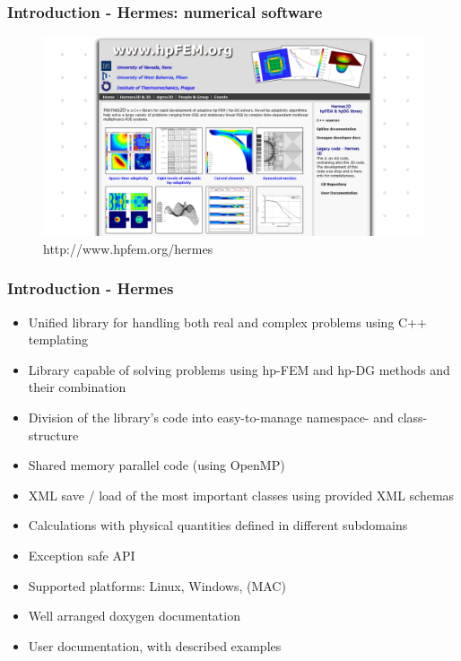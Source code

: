 \documentclass{beamer}
\begin{document}
\begin{frame}
\frametitle{Introduction - Hermes: numerical software}
\begin{figure}[!ht]
\vspace{-1mm}
\begin{center}
\includegraphics[width=1.0\textwidth]{hermes-site.png}
\caption{http://www.hpfem.org/hermes}
\end{center}
\noindent
\vspace{-4mm}
\end{figure}
\end{frame}

\begin{frame}
\frametitle{Introduction - Hermes}
\begin{itemize}
      \item    Unified library for handling both real and complex problems using C++ templating
      \item    Library capable of solving problems using hp-FEM and hp-DG methods and their combination
      \item    Division of the library's code into easy-to-manage namespace- and class- structure
      \item    Shared memory parallel code (using OpenMP)
      \item    XML save / load of the most important classes using provided XML schemas
      \item    Calculations with physical quantities defined in different subdomains
      \item    Exception safe API 
      \item    Supported platforms: Linux, Windows, (MAC)
      \item    Well arranged doxygen documentation
      \item    User documentation, with described examples
\end{itemize}
\end{frame}
\end{document}
